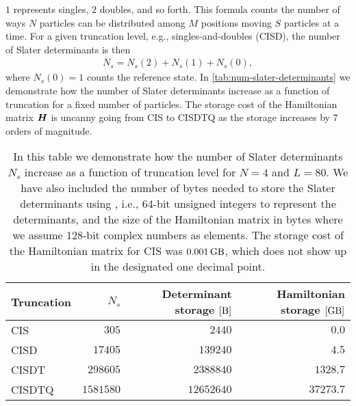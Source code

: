             $1$ represents singles, $2$ doubles, and so forth.
            This formula counts the number of ways $N$ particles can be
            distributed among $M$ positions moving $S$ particles at a time.
            For a given truncation level, e.g., singles-and-doubles (CISD), the
            number of Slater determinants is then
            \begin{align}
                N_s = N_s(2) + N_s(1) + N_s(0),
            \end{align}
            where $N_s(0) = 1$ counts the reference state.
            In \autoref{tab:num-slater-determinants} we demonstrate how the
            number of Slater determinants increase as a function of truncation
            for a fixed number of particles.
            The storage cost of the Hamiltonian matrix $\boldsymbol{H}$ is uncanny
            going from CIS to CISDTQ as the storage increases by $7$ orders of
            magnitude.
            \begin{table}
                \centering
                \caption{In this table we demonstrate how the number of
                Slater determinants $N_s$ increase as a function of truncation
                level for $N = 4$ and $L = 80$.
                We have also included the number of bytes needed to store the
                Slater determinants using , i.e., 64-bit
                unsigned integers to represent the determinants, and the size of
                the Hamiltonian matrix in bytes where we assume 128-bit complex
                numbers as elements.
                The storage cost of the Hamiltonian matrix for CIS was
                $\SI{0.001}{\giga\byte}$, which does not show up in the
                designated one decimal point.}
                \renewcommand{\arraystretch}{1.3}
                \begin{tabular}{@{}lrrr@{}}
                    \toprule
                    Truncation & $N_s$ & Determinant storage $[\si{\byte}]$
                    & Hamiltonian storage $[\si{\giga\byte}]$ \\
                    \midrule
                    CIS & $305$ & $2440$ & $0.0$ \\
                    CISD & $17405$ & $139240$ & $4.5$ \\
                    CISDT & $298605$ & $2388840$ & $1328.7$ \\
                    CISDTQ & $1581580$ & $12652640$ & $37273.7$ \\
                    \bottomrule
                \end{tabular}
                \label{tab:num-slater-determinants}
            \end{table}

